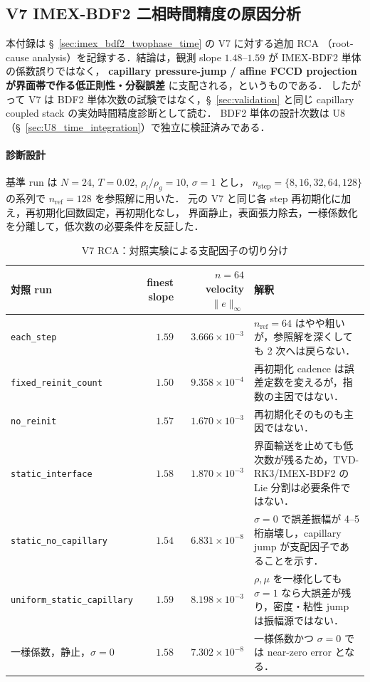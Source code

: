 \subsection{V7 IMEX-BDF2 二相時間精度の原因分析}
\label{app:v7_imex_bdf2_rca}

本付録は §~\ref{sec:imex_bdf2_twophase_time} の V7 に対する追加 RCA
（root-cause analysis）を記録する．結論は，観測 slope $1.48$--$1.59$ が
IMEX-BDF2 単体の係数誤りではなく，
\textbf{capillary pressure-jump / affine FCCD projection が界面帯で作る低正則性・分裂誤差}
に支配される，というものである．
したがって V7 は BDF2 単体次数の試験ではなく，§~\ref{sec:validation} と同じ
capillary coupled stack の実効時間精度診断として読む．
BDF2 単体の設計次数は U8（§~\ref{sec:U8_time_integration}）で独立に検証済みである．

\paragraph{診断設計}

基準 run は $N=24$, $T=0.02$, $\rho_l/\rho_g=10$, $\sigma=1$ とし，
$n_{\mathrm{step}}=\{8,16,32,64,128\}$ の系列で
$n_{\mathrm{ref}}=128$ を参照解に用いた．
元の V7 と同じ各 step 再初期化に加え，再初期化回数固定，再初期化なし，
界面静止，表面張力除去，一様係数化を分離して，低次数の必要条件を反証した．

\begin{table}[htbp]
\centering\scriptsize
\caption{V7 RCA：対照実験による支配因子の切り分け}
\label{tab:v7_rca_controls}
\begin{tabularx}{\linewidth}{>{\raggedright\arraybackslash}p{34mm}r r X}
\toprule
対照 run & finest slope & $n=64$ velocity $\|e\|_\infty$ & 解釈 \\
\midrule
\texttt{each\_step} & $1.59$ & $3.666\times10^{-3}$ &
$n_{\mathrm{ref}}=64$ はやや粗いが，参照解を深くしても 2 次へは戻らない．\\
\texttt{fixed\_reinit\_count} & $1.50$ & $9.358\times10^{-4}$ &
再初期化 cadence は誤差定数を変えるが，指数の主因ではない．\\
\texttt{no\_reinit} & $1.57$ & $1.670\times10^{-3}$ &
再初期化そのものも主因ではない．\\
\texttt{static\_interface} & $1.58$ & $1.870\times10^{-3}$ &
界面輸送を止めても低次数が残るため，TVD-RK3/IMEX-BDF2 の Lie 分割は必要条件ではない．\\
\texttt{static\_no\_capillary} & $1.54$ & $6.831\times10^{-8}$ &
$\sigma=0$ で誤差振幅が 4--5 桁崩壊し，capillary jump が支配因子であることを示す．\\
\texttt{uniform\_static\_capillary} & $1.59$ & $8.198\times10^{-3}$ &
$\rho,\mu$ を一様化しても $\sigma=1$ なら大誤差が残り，密度・粘性 jump は振幅源ではない．\\
一様係数，静止，$\sigma=0$ & $1.58$ & $7.302\times10^{-8}$ &
一様係数かつ $\sigma=0$ では near-zero error となる．\\
\bottomrule
\end{tabularx}
\end{table}

